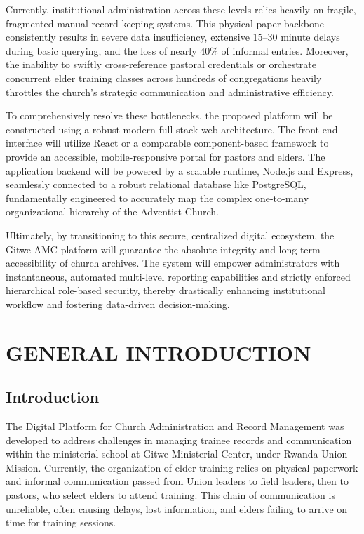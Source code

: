\documentclass[12pt]{report}
\begin{document}
Currently, institutional administration across these levels relies heavily on fragile, fragmented manual record-keeping systems. This physical paper-backbone consistently results in severe data insufficiency, extensive 15--30 minute delays during basic querying, and the loss of nearly 40\% of informal entries. Moreover, the inability to swiftly cross-reference pastoral credentials or orchestrate concurrent elder training classes across hundreds of congregations heavily throttles the church's strategic communication and administrative efficiency.

To comprehensively resolve these bottlenecks, the proposed platform will be constructed using a robust modern full-stack web architecture. The front-end interface will utilize React or a comparable component-based framework to provide an accessible, mobile-responsive portal for pastors and elders. The application backend will be powered by a scalable runtime, Node.js and Express, seamlessly connected to a robust relational database like PostgreSQL, fundamentally engineered to accurately map the complex one-to-many organizational hierarchy of the Adventist Church.

Ultimately, by transitioning to this secure, centralized digital ecosystem, the Gitwe AMC platform will guarantee the absolute integrity and long-term accessibility of church archives. The system will empower administrators with instantaneous, automated multi-level reporting capabilities and strictly enforced hierarchical role-based security, thereby drastically enhancing institutional workflow and fostering data-driven decision-making.

\newpage
{}
\setcounter{page}{1}

\chapter{GENERAL INTRODUCTION}

\section{Introduction}
The Digital Platform for Church Administration and Record Management was developed to address challenges in managing trainee records and communication within the ministerial school at Gitwe Ministerial Center, under Rwanda Union Mission. Currently, the organization of elder training relies on physical paperwork and informal communication passed from Union leaders to field leaders, then to pastors, who select elders to attend training. This chain of communication is unreliable, often causing delays, lost information, and elders failing to arrive on time for training sessions.
\end{document}
